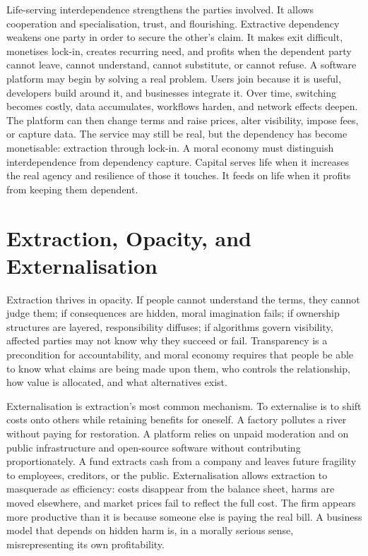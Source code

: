 \documentclass[11pt,a4paper,oneside]{book}
\begin{document}
Life-serving interdependence strengthens the parties involved. It allows cooperation and specialisation, trust, and flourishing. Extractive dependency weakens one party in order to secure the other's claim. It makes exit difficult, monetises lock-in, creates recurring need, and profits when the dependent party cannot leave, cannot understand, cannot substitute, or cannot refuse. A software platform may begin by solving a real problem. Users join because it is useful, developers build around it, and businesses integrate it. Over time, switching becomes costly, data accumulates, workflows harden, and network effects deepen. The platform can then change terms and raise prices, alter visibility, impose fees, or capture data. The service may still be real, but the dependency has become monetisable: extraction through lock-in. A moral economy must distinguish interdependence from dependency capture. Capital serves life when it increases the real agency and resilience of those it touches. It feeds on life when it profits from keeping them dependent.

\section*{Extraction, Opacity, and Externalisation}

Extraction thrives in opacity. If people cannot understand the terms, they cannot judge them; if consequences are hidden, moral imagination fails; if ownership structures are layered, responsibility diffuses; if algorithms govern visibility, affected parties may not know why they succeed or fail. Transparency is a precondition for accountability, and moral economy requires that people be able to know what claims are being made upon them, who controls the relationship, how value is allocated, and what alternatives exist.

Externalisation is extraction's most common mechanism. To externalise is to shift costs onto others while retaining benefits for oneself. A factory pollutes a river without paying for restoration. A platform relies on unpaid moderation and on public infrastructure and open-source software without contributing proportionately. A fund extracts cash from a company and leaves future fragility to employees, creditors, or the public. Externalisation allows extraction to masquerade as efficiency: costs disappear from the balance sheet, harms are moved elsewhere, and market prices fail to reflect the full cost. The firm appears more productive than it is because someone else is paying the real bill. A business model that depends on hidden harm is, in a morally serious sense, misrepresenting its own profitability.
\end{document}
